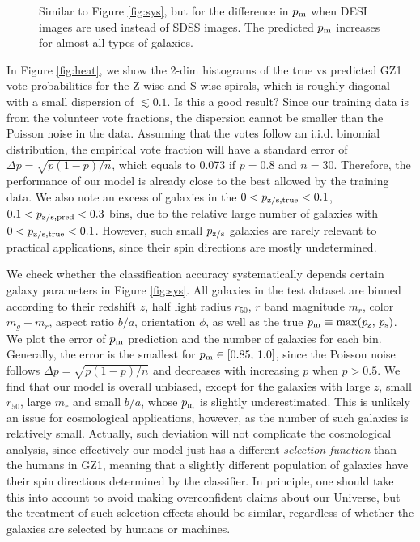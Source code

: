\documentclass[twocolumn]{aastex631}
\begin{document}
\begin{figure}
    \caption{Similar to Figure \ref{fig:sys}, but for the difference in $p_{\rm m}$ when DESI images are used instead of SDSS images.
    The predicted $p_{\rm m}$ increases for almost all types of galaxies.}
    \label{fig:desi-sdss}
\end{figure}

In Figure \ref{fig:heat}, we show the 2-dim histograms of the true vs predicted GZ1 vote probabilities for the Z-wise and S-wise spirals, which is roughly diagonal with a small dispersion of $\lesssim 0.1$.
Is this a good result?
Since our training data is from the volunteer vote fractions, the dispersion cannot be smaller than the Poisson noise in the data.
Assuming that the votes follow an i.i.d. binomial distribution, the empirical vote fraction will have a standard error of $\Delta p=\sqrt{p(1-p)/n}$, which equals to 0.073 if $p=0.8$ and $n=30$.
Therefore, the performance of our model is already close to the best allowed by the training data.
We also note an excess of galaxies in the $0<p_{\rm z/s,true}<0.1$, $0.1<p_{\rm z/s,pred}<0.3$ bins, due to the relative large number of galaxies with $0<p_{\rm z/s,true}<0.1$.
However, such small $p_{\rm z/s}$ galaxies are rarely relevant to practical applications, since their spin directions are mostly undetermined.

We check whether the classification accuracy systematically depends certain galaxy parameters in Figure \ref{fig:sys}.
All galaxies in the test dataset are binned according to their redshift $z$, half light radius $r_{50}$, $r$ band magnitude $m_r$, color $m_g-m_r$, aspect ratio $b/a$,  orientation $\phi$, as well as the true $p_{\rm m} \equiv \max(p_{\rm z},\,p_{\rm s})$.
We plot the error of $p_{\rm m}$ prediction and the number of galaxies for each bin.
Generally, the error is the smallest for $p_{\rm m}\in [0.85,\,1.0]$, since the Poisson noise follows $\Delta p=\sqrt{p(1-p)/n}$ and decreases with increasing $p$ when $p>0.5$.
We find that our model is overall unbiased, except for the galaxies with large $z$, small $r_{50}$, large $m_r$ and small $b/a$, whose $p_{\rm m}$ is slightly underestimated.
This is unlikely an issue for cosmological applications, however, as the number of such galaxies is relatively small.
Actually, such deviation will not complicate the cosmological analysis, since effectively our model just has a different \textit{selection function} than the humans in GZ1, meaning that a slightly different population of galaxies have their spin directions determined by the classifier.
In principle, one should take this into account to avoid making overconfident claims about our Universe, but the treatment of such selection effects should be similar, regardless of whether the galaxies are selected by humans or machines.
\end{document}
